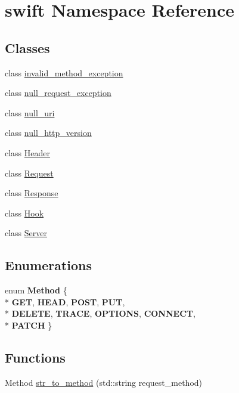 \hypertarget{namespaceswift}{\section{swift Namespace Reference}
\label{namespaceswift}
}
\subsection*{Classes}
\begin{DoxyCompactItemize}
\item 
class \hyperlink{classswift_1_1invalid__method__exception}{invalid\-\_\-method\-\_\-exception}
\item 
class \hyperlink{classswift_1_1null__request__exception}{null\-\_\-request\-\_\-exception}
\item 
class \hyperlink{classswift_1_1null__uri}{null\-\_\-uri}
\item 
class \hyperlink{classswift_1_1null__http__version}{null\-\_\-http\-\_\-version}
\item 
class \hyperlink{classswift_1_1_header}{Header}
\item 
class \hyperlink{classswift_1_1_request}{Request}
\item 
class \hyperlink{classswift_1_1_response}{Response}
\item 
class \hyperlink{classswift_1_1_hook}{Hook}
\item 
class \hyperlink{classswift_1_1_server}{Server}
\end{DoxyCompactItemize}
\subsection*{Enumerations}
\begin{DoxyCompactItemize}
\item 
enum {\bfseries Method} \{ \\*
{\bfseries G\-E\-T}, 
{\bfseries H\-E\-A\-D}, 
{\bfseries P\-O\-S\-T}, 
{\bfseries P\-U\-T}, 
\\*
{\bfseries D\-E\-L\-E\-T\-E}, 
{\bfseries T\-R\-A\-C\-E}, 
{\bfseries O\-P\-T\-I\-O\-N\-S}, 
{\bfseries C\-O\-N\-N\-E\-C\-T}, 
\\*
{\bfseries P\-A\-T\-C\-H}
 \}
\end{DoxyCompactItemize}
\subsection*{Functions}
\begin{DoxyCompactItemize}
\item 
Method \hyperlink{namespaceswift_a54d9cafe8eb822e4a2fedef9d724a702}{str\-\_\-to\-\_\-method} (std\-::string request\-\_\-method)
\end{DoxyCompactItemize}

